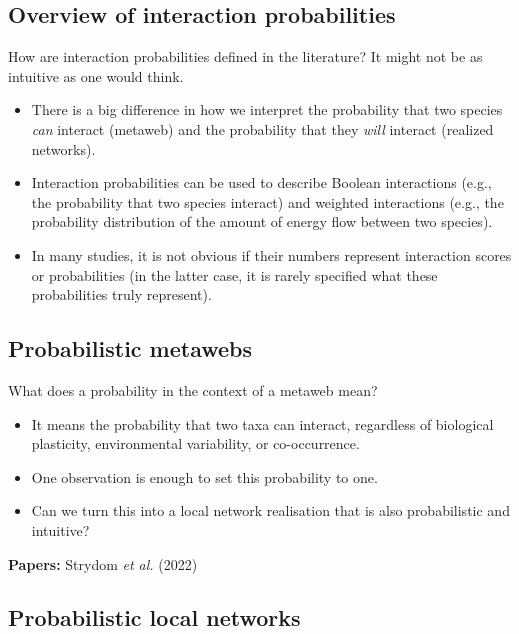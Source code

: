 \documentclass[10pt,oneside]{article}
\begin{document}
\hypertarget{overview-of-interaction-probabilities}{%
\subsection{Overview of interaction
probabilities}\label{overview-of-interaction-probabilities}}

How are interaction probabilities defined in the literature? It might
not be as intuitive as one would think.

\begin{itemize}
\tightlist
\item
  There is a big difference in how we interpret the probability that two
  species \emph{can} interact (metaweb) and the probability that they
  \emph{will} interact (realized networks).
\item
  Interaction probabilities can be used to describe Boolean interactions
  (e.g., the probability that two species interact) and weighted
  interactions (e.g., the probability distribution of the amount of
  energy flow between two species).
\item
  In many studies, it is not obvious if their numbers represent
  interaction scores or probabilities (in the latter case, it is rarely
  specified what these probabilities truly represent).
\end{itemize}

\hypertarget{probabilistic-metawebs}{%
\subsection{Probabilistic metawebs}\label{probabilistic-metawebs}}

What does a probability in the context of a metaweb mean?

\begin{itemize}
\tightlist
\item
  It means the probability that two taxa can interact, regardless of
  biological plasticity, environmental variability, or co-occurrence.
\item
  One observation is enough to set this probability to one.
\item
  Can we turn this into a local network realisation that is also
  probabilistic and intuitive?
\end{itemize}

\textbf{Papers:} Strydom \emph{et al.} (2022)

\hypertarget{probabilistic-local-networks}{%
\subsection{Probabilistic local
networks}\label{probabilistic-local-networks}}
\end{document}
